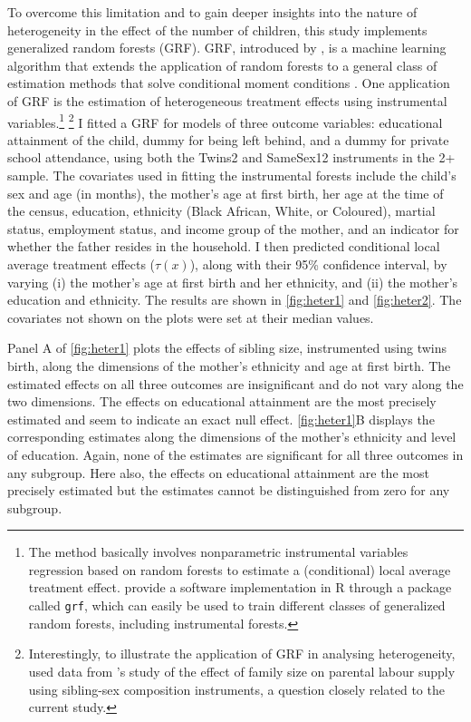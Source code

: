 To overcome this limitation and to gain deeper insights into the nature of heterogeneity in the effect of the number of children, this study implements generalized random forests (GRF). GRF, introduced by \textcite{Athey2019}, is a machine learning algorithm that extends the application of random forests to a general class of estimation methods that solve conditional moment conditions \parencite{Biewen2020}. One application of GRF is the estimation of heterogeneous treatment effects using instrumental variables.\footnote{ The method basically involves nonparametric instrumental variables regression based on random forests to estimate a (conditional) local average treatment effect. \textcite{Athey2019} provide a software implementation in R through a package called \texttt{grf}, which can easily be used to train different classes of generalized random forests, including instrumental forests. } \footnote{ Interestingly, to illustrate the application of GRF in analysing heterogeneity, \textcite{Athey2019} used data from \textcite{angrist_children_1998}'s study of the effect of family size on parental labour supply using sibling-sex composition instruments, a question closely related to the current study. } I fitted a GRF for models of three outcome variables: educational attainment of the child, dummy for being left behind, and a dummy for private school attendance, using both the Twins2 and SameSex12 instruments in the 2+ sample. The covariates used in fitting the instrumental forests include the child's sex and age (in months), the mother's age at first birth, her age at the time of the census, education, ethnicity (Black African, White, or Coloured), martial status, employment status, and income group of the mother, and an indicator for whether the father resides in the household. I then predicted conditional local average treatment effects ($ \tau(x) $), along with their 95\% confidence interval, by varying (i) the mother’s age at first birth and her ethnicity, and (ii) the mother's education and ethnicity. The results are shown in \autoref{fig:heter1} and \autoref{fig:heter2}. The covariates not shown on the plots were set at their median values. 

Panel A of \autoref{fig:heter1} plots the effects of sibling size, instrumented using twins birth, along the dimensions of the mother's ethnicity and age at first birth. The estimated effects on all three outcomes are insignificant and do not vary along the two dimensions. The effects on educational attainment are the most precisely estimated and seem to indicate an exact null effect. \autoref{fig:heter1}B displays the corresponding estimates along the dimensions of the mother's ethnicity and level of education. Again, none of the estimates are significant for all three outcomes in any subgroup. Here also, the effects on educational attainment are the most precisely estimated but the estimates cannot be distinguished from zero for any subgroup. 

